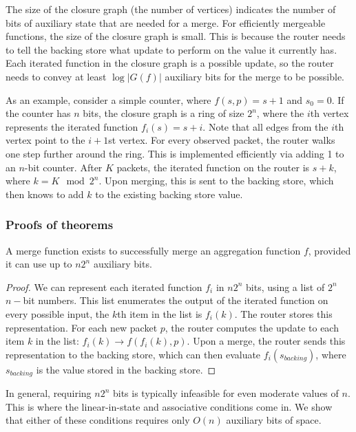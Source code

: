 The size of the closure graph (\ie the number of vertices) indicates the number
of bits of auxiliary state that are needed for a merge. For efficiently
mergeable functions, the size of the closure graph is small. This is because
the router needs to tell the backing store what update to perform on the value
it currently has. Each iterated function in the closure graph is a possible
update, so the router needs to convey at least $\log |G(f)|$ auxiliary bits for
the merge to be possible.

As an example, consider a simple counter, where $f(s, p) = s + 1$ and $s_0 =
0$. If the counter has $n$ bits, the closure graph is a ring of size $2^n$,
where the $i$th vertex represents the iterated function $f_i(s) = s + i$. Note
that all edges from the $i$th vertex point to the $i+1$st vertex. For every
observed packet, the router walks one step further around the ring. This is
implemented efficiently via adding 1 to an $n$-bit counter. After $K$ packets,
the iterated function on the router is $s + k$, where $k = K \mod 2^n$. Upon
merging, this is sent to the backing store, which then knows to add $k$ to the
existing backing store value.

\subsubsection{Proofs of theorems}
\label{ss:proofs}

\begin{theorem}
A merge function exists to successfully merge an aggregation function $f$,
provided it can use up to $n2^n$ auxiliary bits.
\end{theorem}
\begin{proof}
We can represent each iterated function $f_i$ in $n2^n$ bits, using a list of
$2^n$ $n-$bit numbers. This list enumerates the output of the iterated function
on every possible input, \ie the $k$th item in the list is $f_i(k)$. The router
stores this representation. For each new packet $p$, the router computes the
update to each item $k$ in the list: $f_i(k) \rightarrow f(f_i(k), p)$. Upon a
merge, the router sends this representation to the backing store, which can
then evaluate $f_i(s_{backing})$, where $s_{backing}$ is the value stored in
the backing store.
\end{proof}

In general, requiring $n2^n$ bits is typically infeasible for even moderate values of $n$. This is where the linear-in-state and associative conditions come in. We show that either of these conditions requires only $O(n)$ auxiliary bits of space.

